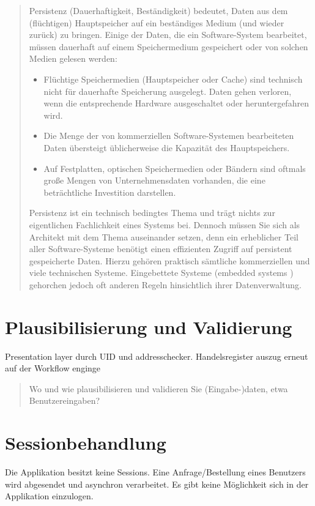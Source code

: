 \begin{quote}
	Persistenz (Dauerhaftigkeit, Beständigkeit) bedeutet, Daten aus dem (flüchtigen) Hauptspeicher auf ein beständiges Medium (und wieder zurück) zu bringen.
	Einige der Daten, die ein Software-System bearbeitet, müssen dauerhaft auf einem Speichermedium gespeichert oder von solchen Medien gelesen werden:
	\begin{itemize}
		\item Flüchtige Speichermedien (Hauptspeicher oder Cache) sind technisch nicht für dauerhafte Speicherung ausgelegt. Daten gehen verloren, wenn die entsprechende Hardware ausgeschaltet oder heruntergefahren wird.
		\item Die Menge der von kommerziellen Software-Systemen bearbeiteten Daten übersteigt üblicherweise die Kapazität des Hauptspeichers.
		\item Auf Festplatten, optischen Speichermedien oder Bändern sind oftmals große Mengen von Unternehmensdaten vorhanden, die eine beträchtliche Investition darstellen.
	\end{itemize}
	Persistenz ist ein technisch bedingtes Thema und trägt nichts zur eigentlichen Fachlichkeit eines Systems bei. Dennoch müssen Sie sich als Architekt mit dem Thema auseinander setzen, denn ein erheblicher Teil aller Software-Systeme benötigt einen effizienten Zugriff auf persistent gespeicherte Daten. Hierzu gehören praktisch sämtliche kommerziellen und viele technischen Systeme. Eingebettete Systeme (embedded systems ) gehorchen jedoch oft anderen Regeln hinsichtlich ihrer Datenverwaltung.
\end{quote}

\section{Plausibilisierung und Validierung}

Presentation layer durch UID und addresschecker. Handelsregister auszug erneut auf der Workflow enginge
\begin{quote}
	Wo und wie plausibilisieren und validieren Sie (Eingabe-)daten, etwa Benutzereingaben?
\end{quote}

\section{Sessionbehandlung}

Die Applikation besitzt keine Sessions. Eine Anfrage/Bestellung eines Benutzers wird abgesendet und asynchron verarbeitet. Es gibt keine Möglichkeit sich in der Applikation einzulogen.

